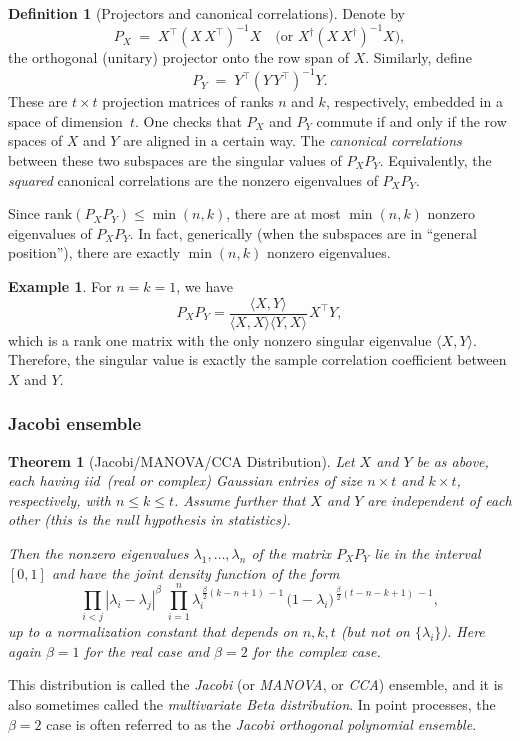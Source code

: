\documentclass[letterpaper,11pt,oneside,reqno]{book}
\numberwithin{equation}{chapter}  %
\newcommand{\ssp}{\hspace{1pt}}
\newtheorem{theorem}[proposition]{Theorem}
\theoremstyle{definition}
\newtheorem{definition}[proposition]{Definition}
\newtheorem{example}[proposition]{Example}
\begin{document}
\begin{definition}[Projectors and canonical correlations]
Denote by
\[
  P_X \;=\; X^\top\!(X\,X^\top)^{-1}X
  \quad\bigl(\text{or }X^\dagger(X\,X^\dagger)^{-1}X\bigr),
\]
the orthogonal (unitary) projector onto the row span of \(X\).
Similarly, define
\[
  P_Y \;=\; Y^\top\!(Y\,Y^\top)^{-1}Y.
\]
These are \(t\times t\) projection matrices of ranks \(n\) and \(k\), respectively, embedded in a space of dimension~\(t\).  One checks that \(P_X\) and \(P_Y\) commute if and only if the row spaces of \(X\) and \(Y\) are aligned in a certain way.  The \emph{canonical correlations} between these two subspaces are the singular values of \(P_X P_Y\).  Equivalently, the \emph{squared} canonical correlations are the nonzero eigenvalues of \(P_X P_Y\).
\end{definition}

Since \(\mathrm{rank}(P_X P_Y)\le \min(n,k)\), there are at most \(\min(n,k)\) nonzero eigenvalues of \(P_X P_Y\).  In fact, generically
(when the subspaces are in ``general position''), there are exactly \(\min(n,k)\) nonzero eigenvalues.

\begin{example}
	For $n=k=1$, we have
	\begin{equation*}
		P_XP_Y=\frac{\langle X,Y \rangle }{\langle X,X \rangle \langle Y,X \rangle }\ssp X^\top Y,
	\end{equation*}
	which is a rank one matrix with the only nonzero singular
	eigenvalue $\langle X,Y \rangle $.
	Therefore, the singular value is exactly the sample correlation
	coefficient between $X$ and $Y$.
\end{example}

\subsubsection{Jacobi ensemble}

\begin{theorem}[Jacobi/MANOVA/CCA Distribution]
\label{lecture3:thm:Jacobi_distribution}
Let \(X\) and \(Y\) be as above, each having iid\ (real
or complex) Gaussian entries of size \(n\times t\) and
\(k\times t\), respectively, with \(n\le k \le t\).  Assume
further that \(X\) and \(Y\) are independent of each other
(this
is the null hypothesis in statistics).

Then the nonzero eigenvalues \(\lambda_1,\ldots,\lambda_n\) of the matrix \(P_X P_Y\) lie in the interval \([0,1]\) and have the joint density function
of the form
\[
  \prod_{i<j} |\lambda_i - \lambda_j|^\beta
  \;\prod_{i=1}^n
  \lambda_i^{\,\frac{\beta}{2}(k-n+1)\,-1}
  \,\bigl(1-\lambda_i\bigr)^{\,\frac{\beta}{2}(t-n-k+1)\,-1},
\]
up to a normalization constant that depends on \(n,k,t\) (but not on \(\{\lambda_i\}\)).
Here again \(\beta=1\) for the real case and \(\beta=2\) for the complex case.
\end{theorem}
This distribution is called the \emph{Jacobi} (or \emph{MANOVA}, or \emph{CCA}) ensemble, and it is also sometimes called the
\emph{multivariate Beta distribution}.
In point processes, the $\beta=2$ case is often referred to as the
\emph{Jacobi orthogonal polynomial ensemble}.
\end{document}
